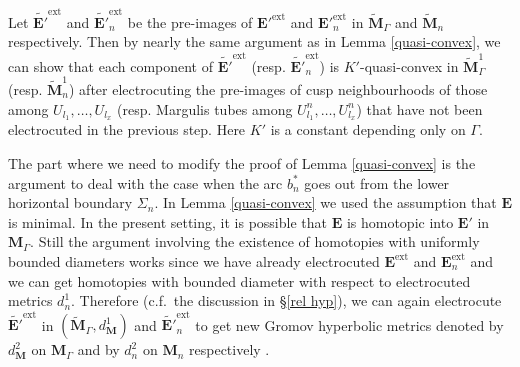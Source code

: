 \documentclass{amsart}
\theoremstyle{definition}
\newcommand{\integers}{\mathbb{Z}}
\begin{document}



Let $\widetilde{\mathbf E'}^\mathrm{ext}$ and $\widetilde{\mathbf E'}^\mathrm{ext}_n$ be the pre-images of ${\mathbf E'}^\mathrm{ext}$ and ${\mathbf E'}^\mathrm{ext}_n$ in $\widetilde{\mathbf M}_\Gamma$ and $\widetilde{\mathbf M}_n$ respectively.
Then by nearly the same argument as in Lemma \ref{quasi-convex}, we can show that each component of $\widetilde{\mathbf E'}^\mathrm{ext}$ (resp. $\widetilde{\mathbf E'}^\mathrm{ext}_n$)  is $K'$-quasi-convex 
in $\widetilde{\mathbf M}_\Gamma^1$ (resp. $\widetilde{\mathbf M}_n^1$) after electrocuting the pre-images of cusp neighbourhoods of those among $U_{l_1}, \dots , U_{l_x}$ (resp.  Margulis tubes among $U^n_{l_1}, \dots , U^n_{l_x}$) that have not been electrocuted in the previous step.
Here $K'$ is a constant depending only on $\Gamma$.

The part where we need to modify the proof of Lemma \ref{quasi-convex} is the argument to deal with the case when the arc $b^*_n$ goes out from the lower horizontal boundary $\Sigma_n$. In
Lemma \ref{quasi-convex} we used the assumption that $\mathbf E$ is minimal.
In the present setting, it is possible that $\mathbf E$ is homotopic into $\mathbf E'$ in $\mathbf M_\Gamma$.
Still the argument involving the existence of homotopies with uniformly bounded diameters works since we have already electrocuted $\mathbf E^\mathrm{ext}$ and $\mathbf E_n^\mathrm{ext}$ and we can get homotopies with bounded diameter with respect to electrocuted metrics $d_n^1$.
Therefore (c.f.\ the discussion in \S \ref{rel hyp}), we can again electrocute $\widetilde{\mathbf E'}^\mathrm{ext}$ in $(\widetilde{\mathbf M}_\Gamma, d^1_\mathbf{M})$  and $\widetilde{\mathbf E'}^\mathrm{ext}_n$ to get new Gromov hyperbolic metrics   denoted by $d^2_\mathbf{M}$ on $\mathbf M_\Gamma$ and  by $d^2_n$ on  $\mathbf M_n$ respectively .
\end{document}
